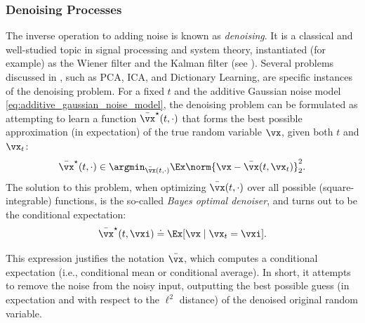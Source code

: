 \documentclass[../../book-main.tex]{subfiles}
\begin{document}
\subsubsection{Denoising Processes}
The inverse operation to adding noise is known as \textit{denoising}.
It is a classical and well-studied topic in signal processing and
system theory, instantiated (for example) as the Wiener filter and
the Kalman filter (see ). Several problems discussed in
, such as PCA, ICA, and Dictionary Learning, are
specific instances of the denoising problem. For a fixed \(t\) and
the additive Gaussian noise model
\eqref{eq:additive_gaussian_noise_model}, the denoising problem can
be formulated as attempting to learn a function \(\bar{\vx}^{\star}(t,
\cdot)\) that forms the best possible approximation (in expectation)
of the true random variable \(\vx\), given both \(t\) and \(\vx_{t}\):
\begin{equation}\label{eq:denoising_loss}
    \bar{\vx}^{\star}(t, \cdot) \in \argmin_{\bar{\vx}(t,
    \cdot)} \Ex \norm{\vx - \bar{\vx}(t, \vx_{t})}_{2}^{2}.
\end{equation}
The solution to this problem, when optimizing \(\bar{\vx}(t, \cdot)\)
over all possible (square-integrable) functions, is the so-called
\textit{Bayes optimal denoiser}, and turns out to be the conditional
expectation:
\begin{equation}\label{eq:optimal_denoiser}
    \bar{\vx}^{\star}(t, \vxi) \doteq \Ex[\vx \mid \vx_{t} = \vxi].
\end{equation}

This expression justifies the notation \(\bar{\vx}\), which computes
a conditional expectation (i.e., conditional mean or conditional
average). In short, it attempts to remove the noise from the noisy
input, outputting the best possible guess (in expectation and with
respect to the \(\ell^{2}\) distance) of the denoised original random variable.
\end{document}
